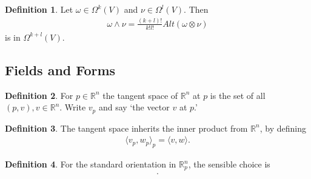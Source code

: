\documentclass[20pt]{article}
\theoremstyle{plain}
\theoremstyle{definition}
\newtheorem{definition}{Definition}
\newcommand{\reals}{\mathbb{R}}
\begin{document}
\begin{definition}
  Let $\omega \in \Omega^k(V)$ and $\nu \in \Omega^l(V)$.
  Then
  \begin{align*}
    \omega \wedge \nu = \frac{(k+l)!}{k!l!}Alt(\omega \otimes \nu)
  \end{align*}
  is in $\Omega^{k+l}(V).$
\end{definition}


















































\break
\subsection{Fields and Forms}
\begin{definition}
  For $p \in \reals^n$ the tangent space of $\reals^n$ at $p$ is the set of all $(p, v), v \in \reals^n$.
  Write $v_p$ and say `the vector $v$ at $p$.'
\end{definition}

\begin{definition}
  The tangent space inherits the inner product from $\reals^n$, by defining 
  \begin{align*}
    \langle v_p, w_p \rangle_p  = \langle v, w \rangle.
  \end{align*}
\end{definition}

\begin{definition}
  For the standard orientation in $\reals^n_p$, the sensible choice is
  \begin{align*}
    [(e_1)_p, ..., (e_n)_p].
  \end{align*}
\end{definition}
\end{document}
